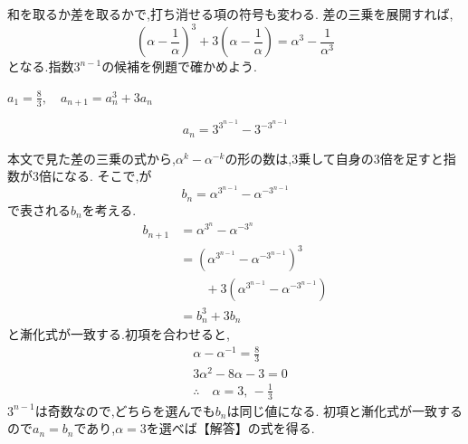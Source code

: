 和を取るか差を取るかで,打ち消せる項の符号も変わる.
差の三乗を展開すれば,
\[
  \left(\alpha-\frac{1}{\alpha}\right)^3
  +3\left(\alpha-\frac{1}{\alpha}\right)
  =\alpha^3-\frac{1}{\alpha^3}
\]
となる.指数$3^{n-1}$の候補を例題で確かめよう.

\noindent{}\par\nobreak
\begin{smallquote}
  $a_1=\frac{8}{3},\quad a_{n+1}=a_n^3+3a_n$
\end{smallquote}
\noindent{}\par\nobreak
\begin{smallquote}
  \[
    a_n=3^{3^{n-1}}-3^{-3^{n-1}}
  \]
\end{smallquote}
\noindent{}\par\nobreak
\begin{smallquote}
  本文で見た差の三乗の式から,$\alpha^k-\alpha^{-k}$の形の数は,3乗して自身の3倍を足すと指数が3倍になる.
  そこで,が
  \[
    b_n=\alpha^{3^{n-1}}-\alpha^{-3^{n-1}}
  \]
  で表される$b_n$を考える.
  \begin{align*}
    b_{n+1}&=\alpha^{3^{n}}-\alpha^{-3^{n}}\\
    &=\left(\alpha^{3^{n-1}}-\alpha^{-3^{n-1}}\right)^3\\
    &\qquad+3\left(\alpha^{3^{n-1}}-\alpha^{-3^{n-1}}\right)\\
    &=b_n^3+3b_n
  \end{align*}
  と漸化式が一致する.初項を合わせると,
  \begin{align*}
    &\alpha-\alpha^{-1}=\frac{8}{3}\\
    &3\alpha^2-8\alpha-3=0\\
    &\therefore \quad \alpha=3,\,-\frac13
  \end{align*}
  $3^{n-1}$は奇数なので,どちらを選んでも$b_n$は同じ値になる.
  初項と漸化式が一致するので$a_n=b_n$であり,$\alpha=3$を選べば【解答】の式を得る.
\end{smallquote}
